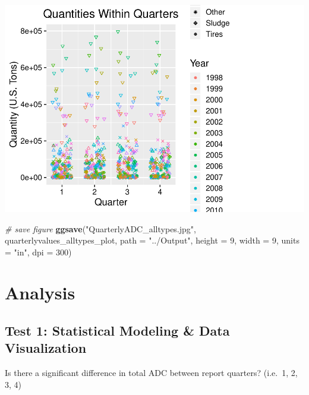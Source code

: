 \documentclass[12pt,]{article}
\newenvironment{Shaded}{\begin{snugshade}}{\end{snugshade}}
\newcommand{\KeywordTok}[1]{\textcolor[rgb]{0.13,0.29,0.53}{\textbf{#1}}}
\newcommand{\DataTypeTok}[1]{\textcolor[rgb]{0.13,0.29,0.53}{#1}}
\newcommand{\DecValTok}[1]{\textcolor[rgb]{0.00,0.00,0.81}{#1}}
\newcommand{\StringTok}[1]{\textcolor[rgb]{0.31,0.60,0.02}{#1}}
\newcommand{\CommentTok}[1]{\textcolor[rgb]{0.56,0.35,0.01}{\textit{#1}}}
\newcommand{\OperatorTok}[1]{\textcolor[rgb]{0.81,0.36,0.00}{\textbf{#1}}}
\newcommand{\NormalTok}[1]{#1}
\begin{document}
\includegraphics{SKo_Project_Template_files/figure-latex/explore_graphs-3.pdf}

\begin{Shaded}
\begin{Highlighting}[]
\CommentTok{# save figure}
\KeywordTok{ggsave}\NormalTok{(}\StringTok{"QuarterlyADC_alltypes.jpg"}\NormalTok{, quarterlyvalues_alltypes_plot, }\DataTypeTok{path =} \StringTok{"../Output"}\NormalTok{, }\DataTypeTok{height =} \DecValTok{9}\NormalTok{, }\DataTypeTok{width =} \DecValTok{9}\NormalTok{, }\DataTypeTok{units =} \StringTok{"in"}\NormalTok{, }\DataTypeTok{dpi =} \DecValTok{300}\NormalTok{)}
\end{Highlighting}
\end{Shaded}

\newpage

\section{Analysis}\label{analysis}

\subsection{Test 1: Statistical Modeling \& Data
Visualization}\label{test-1-statistical-modeling-data-visualization}

Is there a significant difference in total ADC between report quarters?
(i.e.~1, 2, 3, 4)

\begin{Shaded}
\end{Shaded}
\end{document}
